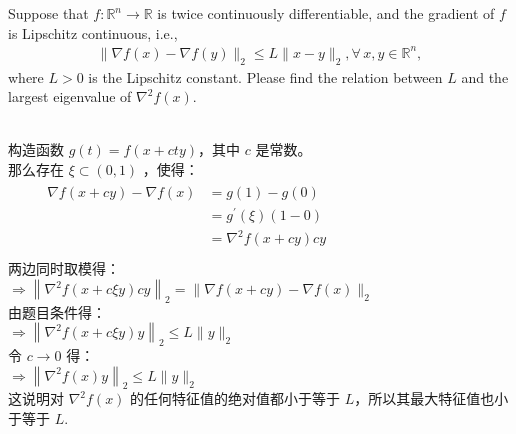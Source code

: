 \documentclass[11pt,letter,notitlepage]{article}
\begin{document}
\begin{exercise}
Suppose that $f:\mathbb{R}^n\rightarrow\mathbb{R}$ is twice continuously differentiable, and the gradient of $f$ is Lipschitz continuous, i.e.,
\begin{align*}
    \|\nabla f(x)-\nabla f(y)\|_2\le L\|x-y\|_2, \forall\,x,y\in\mathbb{R}^n,
\end{align*}
where $L>0$ is the Lipschitz constant. Please find the relation between $L$ and the largest eigenvalue of $\nabla^2 f(x)$.
\end{exercise}
\begin{solution}
    \heiti \ \\
    构造函数 $g(t)= f(x+c t y)$，其中 $c$ 是常数。\\
    那么存在 $\xi \subset (0,1)$ ，使得：\\
    $\begin{array}{l}{\qquad \begin{aligned}  \nabla f(x+c y)-\nabla f(x) &=g(1)-g(0) \\ &=g^{\prime}\left(\xi \right)(1-0) \\ &=\nabla^{2} f(x+c y)c y \end{aligned}} \\  \end{array}$\\
    两边同时取模得：\\
    $ \Rightarrow \left\|\nabla^{2} f(x+c \xi y) c y\right\|_2 =\|\nabla f(x+c y)-\nabla f(x)\|_2$\\
    由题目条件得：\\
    ${\Rightarrow\left\|\nabla^{2} f(x+c \xi y) y\right\|_2 \leqslant L\|y\|_2}$\\
    令 ${c \rightarrow 0}$ 得：\\
    ${\Rightarrow\left\|\nabla^{2} f(x) y\right\|_2 \leqslant L\|y\|_2}$\\
    这说明对 $\nabla^{2}f(x)$ 的任何特征值的绝对值都小于等于 $L$，所以其最大特征值也小于等于 $L$.
\end{solution}
\newpage
\end{document}
